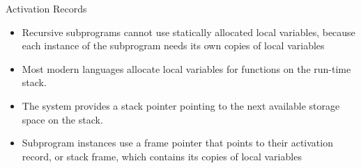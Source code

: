 \documentclass{beamer}
\begin{document}
\begin{frame}{Activation Records}

\begin{itemize}

\item Recursive subprograms cannot use statically allocated local
  variables, because each instance of the subprogram needs its own
  copies of local variables

\item Most modern languages allocate local variables for functions on
  the run-time stack.

\item The system provides a stack pointer pointing to the next
  available storage space on the stack.

\item Subprogram instances use a frame pointer that points to their
  activation record, or stack frame, which contains its copies of
  local variables

\end{itemize}

\end{frame}
\end{document}
